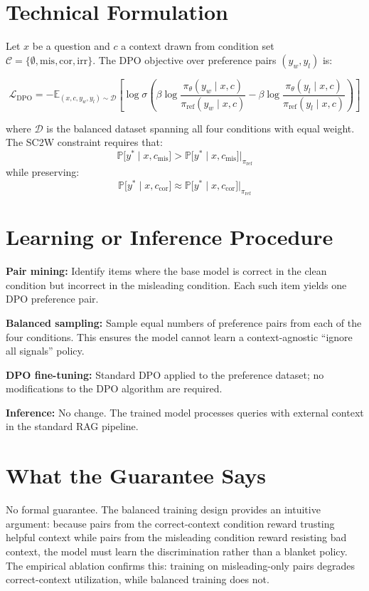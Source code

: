 \documentclass[10pt,twocolumn]{article}
\begin{document}
\section{Technical Formulation}

Let $x$ be a question and $c$ a context drawn from condition set
$\mathcal{C} = \{\emptyset, \text{mis}, \text{cor}, \text{irr}\}$.
The DPO objective over preference pairs $(y_w, y_l)$ is:

\[
\mathcal{L}_{\mathrm{DPO}} = -\mathbb{E}_{(x,c,y_w,y_l) \sim \mathcal{D}}\!\left[
  \log\sigma\!\left(\beta\log\frac{\pi_\theta(y_w \mid x,c)}{\pi_{\mathrm{ref}}(y_w \mid x,c)}
  - \beta\log\frac{\pi_\theta(y_l \mid x,c)}{\pi_{\mathrm{ref}}(y_l \mid x,c)}\right)\right]
\]

where $\mathcal{D}$ is the balanced dataset spanning all four conditions with equal weight.
The SC2W constraint requires that:
\[
\mathbb{P}\bigl[y^* \mid x, c_{\mathrm{mis}}\bigr] >
\mathbb{P}\bigl[y^* \mid x, c_{\mathrm{mis}}\bigr]\big|_{\pi_{\mathrm{ref}}}
\]
while preserving:
\[
\mathbb{P}\bigl[y^* \mid x, c_{\mathrm{cor}}\bigr] \approx
\mathbb{P}\bigl[y^* \mid x, c_{\mathrm{cor}}\bigr]\big|_{\pi_{\mathrm{ref}}}
\]

\section{Learning or Inference Procedure}

\textbf{Pair mining:} Identify items where the base model is correct in the clean
condition but incorrect in the misleading condition. Each such item yields one DPO
preference pair.

\textbf{Balanced sampling:} Sample equal numbers of preference pairs from each of
the four conditions. This ensures the model cannot learn a context-agnostic
``ignore all signals'' policy.

\textbf{DPO fine-tuning:} Standard DPO applied to the preference dataset; no
modifications to the DPO algorithm are required.

\textbf{Inference:} No change. The trained model processes queries with external
context in the standard RAG pipeline.

\section{What the Guarantee Says}

No formal guarantee. The balanced training design provides an intuitive argument:
because pairs from the correct-context condition reward trusting helpful context
while pairs from the misleading condition reward resisting bad context, the model
must learn the discrimination rather than a blanket policy. The empirical ablation
confirms this: training on misleading-only pairs degrades correct-context
utilization, while balanced training does not.
\end{document}
